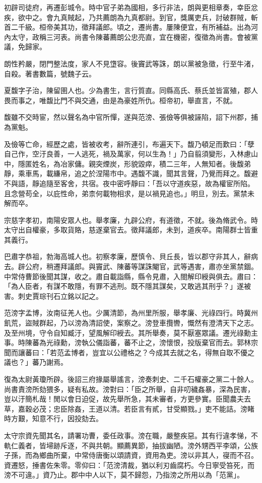 \begin{pinyinscope}
初辟司徒府，再遷彭城令。時中官子弟為國相，多行非法，朗與更相章奏，幸臣忿疾，欲中之。會九真賊起，乃共薦朗為九真都尉。到官，獎厲吏兵，討破群賊，斬首二千級。桓帝美其功，徵拜議郎。頃之，遷尚書。屢陳便宜，有所補益。出為河內太守，政稱三河表。尚書令陳蕃薦朗公忠亮直，宜在機密，復徵為尚書。會被黨議，免歸家。

朗性矜嚴，閉門整法度，家人不見墯容。後竇武等誅，朗以黨被急徵，行至牛渚，自殺。著書數篇，號魏子云。

夏馥字子治，陳留圉人也。少為書生，言行質直。同縣高氏、蔡氏並皆富殖，郡人畏而事之，唯馥比門不與交通，由是為豪姓所仇。桓帝初，舉直言，不就。

馥雖不交時宦，然以聲名為中官所憚，遂與范滂、張儉等俱被誣陷，詔下州郡，捕為黨魁。

及儉等亡命，經歷之處，皆被收考，辭所連引，布遍天下。馥乃頓足而歎曰：「孽自己作，空汙良善，一人逃死，禍及萬家，何以生為！」乃自翦須變形，入林慮山中，隱匿姓名，為冶家傭。親突煙炭，形貌毀瘁，積二三年，人無知者。後馥弟靜，乘車馬，載縑帛，追之於涅陽市中。遇馥不識，聞其言聲，乃覺而拜之。馥避不與語，靜追隨至客舍，共宿。夜中密呼靜曰：「吾以守道疾惡，故為權宦所陷。且念營苟全，以庇性命，弟柰何載物相求，是以禍見追也。」明旦，別去。黨禁未解而卒。

宗慈字孝初，南陽安眾人也。舉孝廉，九辟公府，有道徵，不就。後為脩武令。時太守出自權豪，多取貨賂，慈遂棄官去。徵拜議郎，未到，道疾卒。南陽群士皆重其義行。

巴肅字恭祖，勃海高城人也。初察孝廉，歷慎令、貝丘長，皆以郡守非其人，辭病去。辟公府，稍遷拜議郎。與竇武、陳蕃等謀誅閹官，武等遇害，肅亦坐黨禁錮。中常侍曹節後聞其謀，收之。肅自載詣縣，縣令見肅，入閤解印綬與俱去。肅曰：「為人臣者，有謀不敢隱，有罪不逃刑。既不隱其謀矣，又敢逃其刑乎？」遂被害。刺史賈琮刊石立銘以記之。

范滂字孟博，汝南征羌人也。少厲清節，為州里所服，舉孝廉、光祿四行。時冀州飢荒，盜賊群起，乃以滂為清詔使，案察之。滂登車攬轡，慨然有澄清天下之志。及至州境，守令自知臧汙，望風解印綬去。其所舉奏，莫不厭塞眾議。遷光祿勳主事。時陳蕃為光祿勳，滂執公儀詣蕃，蕃不止之，滂懷恨，投版棄官而去。郭林宗聞而讓蕃曰：「若范孟博者，豈宜以公禮格之？今成其去就之名，得無自取不優之議也？」蕃乃謝焉。

復為太尉黃瓊所辟。後詔三府掾屬舉謠言，滂奏刺史、二千石權豪之黨二十餘人。尚書責滂所劾猥多，疑有私故。滂對曰：「臣之所舉，自非叨穢姦暴，深為民害，豈以汙簡札哉！閒以會日迫促，故先舉所急，其未審者，方更參實。臣聞農夫去草，嘉穀必茂；忠臣除姦，王道以清。若臣言有貳，甘受顯戮。」吏不能詰。滂睹時方艱，知意不行，因投劾去。

太守宗資先聞其名，請署功曹，委任政事。滂在職，嚴整疾惡。其有行違孝悌，不軌仁義者，皆埽跡斥逐，不與共朝。顯薦異節，抽拔幽陋。滂外甥西平李頌，公族子孫，而為鄉曲所棄，中常侍唐衡以頌請資，資用為吏。滂以非其人，寑而不召。資遷怒，捶書佐朱零。零仰曰：「范滂清裁，猶以利刃齒腐朽。今日寧受笞死，而滂不可違。」資乃止。郡中中人以下，莫不歸怨，乃指滂之所用以為「范黨」。


\end{pinyinscope}
